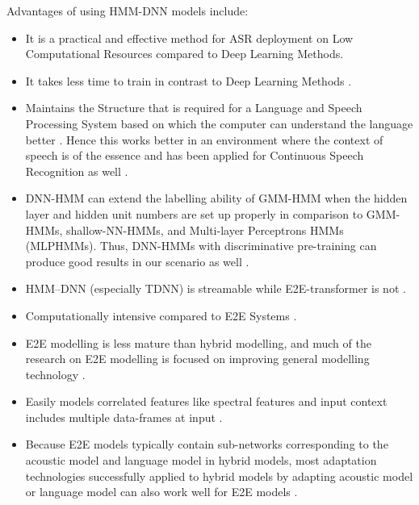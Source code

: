 Advantages of using HMM-DNN models include:
\begin{itemize}
     \item It is a practical and effective method for ASR deployment on Low Computational Resources compared to Deep Learning Methods. 
     \item It takes less time to train in contrast to Deep Learning Methods \cite{naeem_subspace_2020}.
    \item Maintains the Structure that is required for a Language and Speech Processing System based on which the computer can understand the language better \cite{kincaid_state_2018}. Hence this works better in an environment where the context of speech is of the essence and has been applied for Continuous Speech Recognition as well \cite{backstrom_introduction_2022, morgan_continuous_1995}. 
    \item DNN-HMM can extend the labelling ability of GMM-HMM when the hidden layer and hidden unit numbers are set up properly in comparison to GMM-HMMs, shallow-NN-HMMs, and Multi-layer Perceptrons HMMs (MLPHMMs). Thus, DNN-HMMs with discriminative pre-training can produce good results in our scenario as well \cite{li_hybrid_2013}.
    \item HMM–DNN (especially TDNN) is streamable while E2E-transformer is not \cite{ritter_neural_2019}. 
    \item Computationally intensive compared to E2E Systems \cite{kincaid_brief_2018}.
    \item E2E modelling is less mature than hybrid modelling, and much of the research on E2E modelling is focused on improving general modelling technology \cite{backstrom_introduction_2022}. 
    \item Easily models correlated features like spectral features and input context includes multiple data-frames at input \cite{backstrom_introduction_2022}. 
    \item Because E2E models typically contain sub-networks corresponding to the acoustic model and language model in hybrid models, most adaptation technologies successfully applied to hybrid models by adapting acoustic model or language model can also work well for E2E models \cite{backstrom_introduction_2022}. %

\end{itemize}
